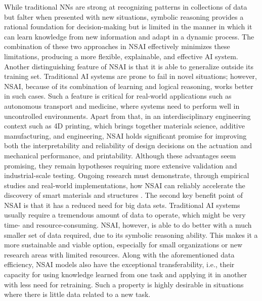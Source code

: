 \documentclass[12pt]{article}
\begin{document}
\vspace*{0.5cm}

While traditional NNs are strong at recognizing patterns in collections of data but falter when presented with new situations, symbolic reasoning provides a rational foundation for decision-making but is limited in the manner in which it can learn knowledge from new information and adapt in a dynamic process. The combination of these two approaches in NSAI effectively minimizes these limitations, producing a more flexible, explainable, and effective AI system.
Another distinguishing feature of NSAI is that it is able to generalize outside its training set. Traditional AI systems are prone to fail in novel situations; however, NSAI, because of its combination of learning and logical reasoning, works better in such cases. Such a feature is critical for real-world applications such as autonomous transport and medicine, where systems need to perform well in uncontrolled environments. Apart from that, in an interdisciplinary engineering context such as 4D printing, which brings together materials science, additive manufacturing, and engineering, NSAI holds significant promise for improving both the interpretability and reliability of design decisions on the actuation and mechanical performance, and printability. Although these advantages seem promising, they remain hypotheses requiring more extensive validation and industrial-scale testing. Ongoing research must demonstrate, through empirical studies and real-world implementations, how NSAI can reliably accelerate the discovery of smart materials and structures \cite{bougzime2025nsai4d}. The second key benefit point of NSAI is that it has a reduced need for big data sets. Traditional AI systems usually require a tremendous amount of data to operate, which might be very time- and resource-consuming. NSAI, however, is able to do better with a much smaller set of data required, due to its symbolic reasoning ability. This makes it a more sustainable and viable option, especially for small organizations or new research areas with limited resources. Along with the aforementioned data efficiency, NSAI models also have the exceptional transferability, i.e., their capacity for using knowledge learned from one task and applying it in another with less need for retraining. Such a property is highly desirable in situations where there is little data related to a new task.

\vspace*{0.5cm}

\end{document}
